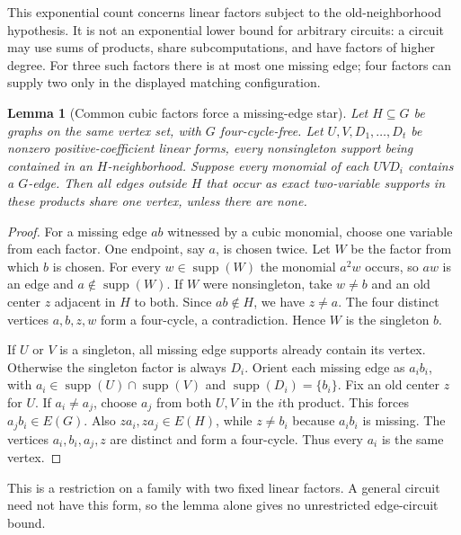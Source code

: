 \documentclass[11pt]{article}
\newcommand{\supp}{\operatorname{supp}}
\newtheorem{lemma}[theorem]{Lemma}
\theoremstyle{definition}
\theoremstyle{remark}
\begin{document}
This exponential count concerns linear factors subject to the old-neighborhood hypothesis. It is not an exponential lower bound for arbitrary circuits: a circuit may use sums of products, share subcomputations, and have factors of higher degree. For three such factors there is at most one missing edge; four factors can supply two only in the displayed matching configuration.

\begin{lemma}[Common cubic factors force a missing-edge star]\label{lem:commoncubic}
Let $H\subseteq G$ be graphs on the same vertex set, with $G$ four-cycle-free. Let $U,V,D_1,\ldots,D_t$ be nonzero positive-coefficient linear forms, every nonsingleton support being contained in an $H$-neighborhood. Suppose every monomial of each $UVD_i$ contains a $G$-edge. Then all edges outside $H$ that occur as exact two-variable supports in these products share one vertex, unless there are none.
\end{lemma}
\begin{proof}
For a missing edge $ab$ witnessed by a cubic monomial, choose one variable from each factor. One endpoint, say $a$, is chosen twice. Let $W$ be the factor from which $b$ is chosen. For every $w\in\supp(W)$ the monomial $a^2w$ occurs, so $aw$ is an edge and $a\notin\supp(W)$. If $W$ were nonsingleton, take $w\ne b$ and an old center $z$ adjacent in $H$ to both. Since $ab\notin H$, we have $z\ne a$. The four distinct vertices $a,b,z,w$ form a four-cycle, a contradiction. Hence $W$ is the singleton $b$.

If $U$ or $V$ is a singleton, all missing edge supports already contain its vertex. Otherwise the singleton factor is always $D_i$. Orient each missing edge as $a_i b_i$, with $a_i\in\supp(U)\cap\supp(V)$ and $\supp(D_i)=\{b_i\}$. Fix an old center $z$ for $U$. If $a_i\ne a_j$, choose $a_j$ from both $U,V$ in the $i$th product. This forces $a_jb_i\in E(G)$. Also $za_i,za_j\in E(H)$, while $z\ne b_i$ because $a_ib_i$ is missing. The vertices $a_i,b_i,a_j,z$ are distinct and form a four-cycle. Thus every $a_i$ is the same vertex.
\end{proof}
This is a restriction on a family with two fixed linear factors. A general circuit need not have this form, so the lemma alone gives no unrestricted edge-circuit bound.
\end{document}

